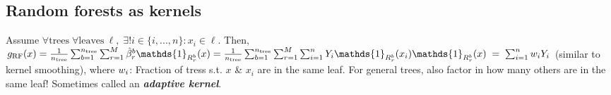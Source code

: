 \subsection*{Random forests as kernels}
Assume $\forall \text{trees} \; \forall \text{leaves} \: \ell, \; \exists! i \in \{i,...,n\} \colon x_i \in \ell$. Then, \\
$g_{\text{RF}}(x) = \frac{1}{n_{\text{tree}}} \sum_{b=1}^{n_\text{tree}}\sum_{r=1}^{M} \hat{\beta}_r^b \mathds{1}_{R_r^b}(x)  \\
= \frac{1}{n_{\text{tree}}} \sum_{b=1}^{n_\text{tree}}\sum_{r=1}^{M}\sum_{i=1}^n Y_i \mathds{1}_{R_r^b}(x_i) \mathds{1}_{R_r^b}(x) \; = \; \mathcolor{black}{\sum_{i=1}^n w_iY_i}$ (similar to kernel smoothing), where $\mathcolor{black}{w_i}$: Fraction of tress s.t. $x$ \& $x_i$ are in the same leaf. For general trees, also factor in how many others are in the same leaf! Sometimes called an \textbf{\emph{adaptive kernel}}.